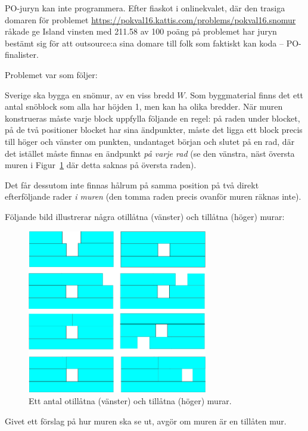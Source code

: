 PO-juryn kan inte programmera. Efter fiaskot i onlinekvalet, där den trasiga domaren för problemet \href{Snömur}{https://pokval16.kattis.com/problems/pokval16.snomur} råkade ge Island vinsten med 211.58 av 100 poäng på problemet har juryn bestämt sig för att outsource:a sina domare till folk som faktiskt kan koda -- PO-finalister.

Problemet var som följer:

Sverige ska bygga en snömur, av en viss bredd $W$.
Som byggmaterial finns det ett antal snöblock som alla har höjden 1, men kan ha olika bredder.
När muren konstrueras måste varje block uppfylla följande en regel: på raden under blocket,
på de två positioner blocket har sina ändpunkter, måste det ligga ett block precis till höger och vänster om punkten,
undantaget början och slutet på en rad, där det istället måste finnas en ändpunkt \emph{på varje rad} (se den vänstra, näst översta muren i Figur~\ref{fig:sample} där detta saknas på översta raden).

Det får dessutom inte finnas hålrum på samma position på två direkt efterföljande rader \emph{i muren} (den tomma raden
precis ovanför muren räknas inte).

Följande bild illustrerar några otillåtna (vänster) och tillåtna (höger) murar:

\begin{figure}[h]
	\centering
	\includegraphics[width=0.7\textwidth]{mur.png}
	\caption{Ett antal otillåtna (vänster) och tillåtna (höger) murar.}
  \label{fig:sample}
\end{figure}

Givet ett förslag på hur muren ska se ut, avgör om muren är en tillåten mur.

